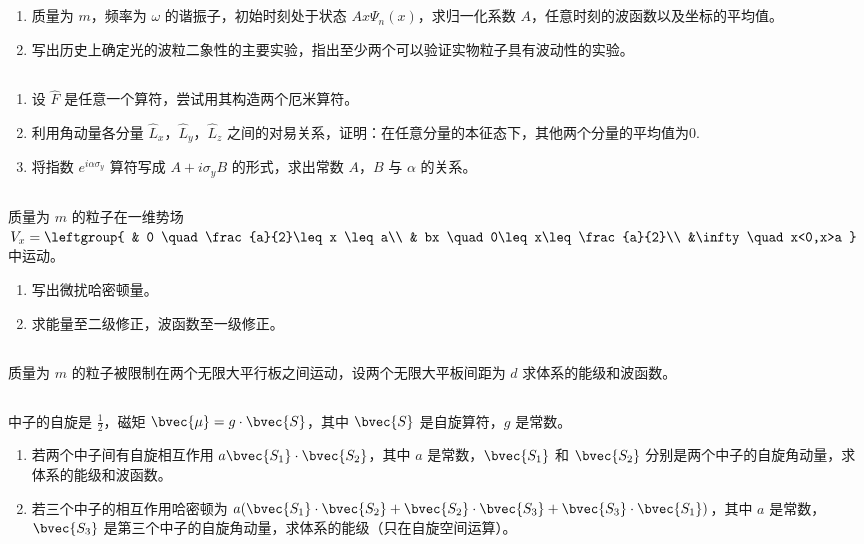 
\subsection{ }
\begin{enumerate}
\item 质量为 $m$，频率为 $\omega$ 的谐振子，初始时刻处于状态 $Ax\varPsi_{n}(x)$，求归一化系数 $A$，任意时刻的波函数以及坐标的平均值。
\item 写出历史上确定光的波粒二象性的主要实验，指出至少两个可以验证实物粒子具有波动性的实验。
\end{enumerate}
\subsection{ }
\begin{enumerate}
\item 设 $\hat{F}$ 是任意一个算符，尝试用其构造两个厄米算符。
\item 利用角动量各分量 $\hat{L}_{x}$，$\hat{L}_{y}$，$\hat{L}_{z}$ 之间的对易关系，证明：在任意分量的本征态下，其他两个分量的平均值为0.
\item 将指数 $e^{i\alpha \sigma_{y}}$ 算符写成 $A+i\sigma_{y}B$ 的形式，求出常数 $A$，$B$ 与 $\alpha$ 的关系。
\end{enumerate}
\subsection{ }
质量为 $m$ 的粒子在一维势场 $V_{x}=\leftgroup{
    & 0 \quad \frac{a}{2}\leq x \leq a\\
    & bx \quad 0\leq x\leq\frac{a}{2}\\
    &\infty \quad x<0,x>a
    }$ 中运动。
\begin{enumerate}
\item 写出微扰哈密顿量。
\item 求能量至二级修正，波函数至一级修正。
\end{enumerate}
\subsection{ }
质量为 $m$ 的粒子被限制在两个无限大平行板之间运动，设两个无限大平板间距为 $d$ 求体系的能级和波函数。
\subsection{ }
中子的自旋是 $\frac{1}{2}$，磁矩 $\bvec{\mu}=g\cdot\bvec{S}$，其中 $\bvec{S}$ 是自旋算符，$g$ 是常数。
\begin{enumerate}
\item 若两个中子间有自旋相互作用 $a\bvec{S_1}\cdot\bvec{S_2}$，其中 $a$ 是常数，$\bvec{S_1}$ 和 $\bvec{S_2}$ 分别是两个中子的自旋角动量，求体系的能级和波函数。
\item 若三个中子的相互作用哈密顿为 $a(\bvec{S_{1}}\cdot\bvec{S_{2}}+\bvec{S_{2}}\cdot\bvec{S_{3}}+\bvec{S_{3}}\cdot\bvec{S_{1}})$，其中 $a$ 是常数，$\bvec{S_{3}}$ 是第三个中子的自旋角动量，求体系的能级（只在自旋空间运算）。
\end{enumerate}

